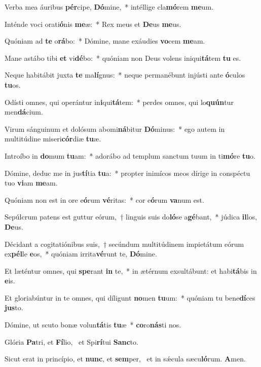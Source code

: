 \item Verba mea áuribus \textbf{pér}cipe, \textbf{Dó}mine,~* intéllige cla\textbf{mó}rem \textbf{me}um.
\item Inténde voci orati\textbf{ó}nis \textbf{me}æ:~* Rex meus et \textbf{De}us \textbf{me}us.
\item Quóniam ad \textbf{te} o\textbf{rá}bo:~* Dómine, mane exáudies \textbf{vo}cem \textbf{me}am.
\item Mane astábo tibi \textbf{et} vi\textbf{dé}bo:~* quóniam non Deus volens iniqui\textbf{tá}tem \textbf{tu} es.
\item Neque habitábit juxta \textbf{te} ma\textbf{lí}gnus:~* neque permanébunt injústi ante \textbf{ó}culos \textbf{tu}os.
\item Odísti omnes, qui operántur in\textbf{i}qui\textbf{tá}tem:~* perdes omnes, qui lo\textbf{quún}tur men\textbf{dá}cium.
\item Virum sánguinum et dolósum abomi\textbf{ná}bitur \textbf{Dó}minus:~* ego autem in multitúdine miseri\textbf{cór}diæ \textbf{tu}æ.
\item Introíbo in \textbf{do}mum \textbf{tu}am:~* adorábo ad templum sanctum tuum in ti\textbf{mó}re \textbf{tu}o.
\item Dómine, deduc me in jus\textbf{tí}tia \textbf{tu}a:~* propter inimícos meos dírige in conspéctu tuo \textbf{vi}am \textbf{me}am.
\item Quóniam non est in ore e\textbf{ó}rum \textbf{vé}ritas:~* cor e\textbf{ó}rum \textbf{va}num est.
\item Sepúlcrum patens est guttur eórum,~† linguis suis do\textbf{ló}se a\textbf{gé}bant,~* júdica \textbf{il}los, \textbf{De}us.
\item Décidant a cogitatiónibus suis,~† secúndum multitúdinem impietátum eórum ex\textbf{pél}le \textbf{e}os,~* quóniam irrita\textbf{vé}runt te, \textbf{Dó}mine.
\item Et læténtur omnes, qui \textbf{spe}rant \textbf{in} te,~* in ætérnum exsultábunt: et habi\textbf{tá}bis in \textbf{e}is.
\item Et gloriabúntur in te omnes, qui díligunt \textbf{no}men \textbf{tu}um:~* quóniam tu bene\textbf{dí}ces \textbf{jus}to.
\item Dómine, ut scuto bonæ volun\textbf{tá}tis \textbf{tu}æ~* \textbf{co}ro\textbf{nás}ti nos.
\item Glória \textbf{Pa}tri, et \textbf{Fí}lio,~\psstar{} et Spi\textbf{rí}tui \textbf{Sanc}to.
\item Sicut erat in princípio, et \textbf{nunc}, et \textbf{sem}per,~\psstar{} et in sǽcula sæcu\textbf{ló}rum. \textbf{A}men.
